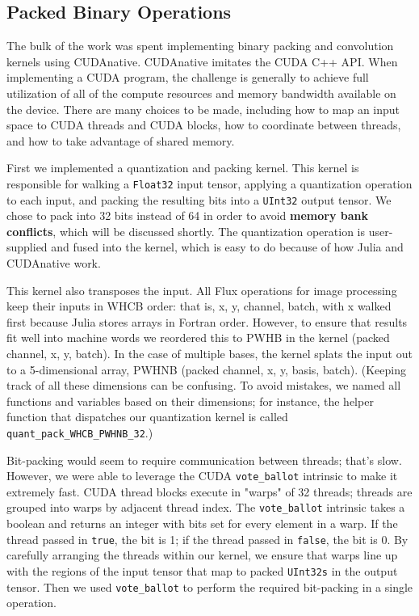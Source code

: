\documentclass[12pt]{article}
\begin{document}
\subsection{Packed Binary Operations}
\label{sec:orgc1de960}

The bulk of the work was spent implementing binary packing and convolution kernels using CUDAnative. CUDAnative imitates the CUDA C++ API. When implementing a CUDA program, the challenge is generally to achieve full utilization of all of the compute resources and memory bandwidth available on the device. There are many choices to be made, including how to map an input space to CUDA threads and CUDA blocks, how to coordinate between threads, and how to take advantage of shared memory.

First we implemented a quantization and packing kernel. This kernel is responsible for walking a \texttt{Float32} input tensor, applying a quantization operation to each input, and packing the resulting bits into a \texttt{UInt32} output tensor. We chose to pack into 32 bits instead of 64 in order to avoid \textbf{memory bank conflicts}, which will be discussed shortly. The quantization operation is user-supplied and fused into the kernel, which is easy to do because of how Julia and CUDAnative work.

This kernel also transposes the input.
All Flux operations for image processing keep their inputs in WHCB order: that is, x, y, channel, batch, with x walked first because Julia stores arrays in Fortran order. However, to ensure that results fit well into machine words we reordered this to PWHB in the kernel (packed channel, x, y, batch). In the case of multiple bases, the kernel splats the input out to a 5-dimensional array, PWHNB (packed channel, x, y, basis, batch).
(Keeping track of all these dimensions can be confusing. To avoid mistakes, we named all functions and variables based on their dimensions; for instance, the helper function that dispatches our quantization kernel is called \texttt{quant\_pack\_WHCB\_PWHNB\_32}.)

Bit-packing would seem to require communication between threads; that's slow. However, we were able to leverage the CUDA \texttt{vote\_ballot} intrinsic to make it extremely fast. CUDA thread blocks execute in "warps" of 32 threads; threads are grouped into warps by adjacent thread index.
The \texttt{vote\_ballot} intrinsic takes a boolean and returns an integer with bits set for every element in a warp. If the thread passed in \texttt{true}, the bit is 1; if the thread passed in \texttt{false}, the bit is 0. By carefully arranging the threads within our kernel, we ensure that warps line up with the regions of the input tensor that map to packed \texttt{UInt32s} in the output tensor. Then we used \texttt{vote\_ballot} to perform the required bit-packing in a single operation.
\end{document}

